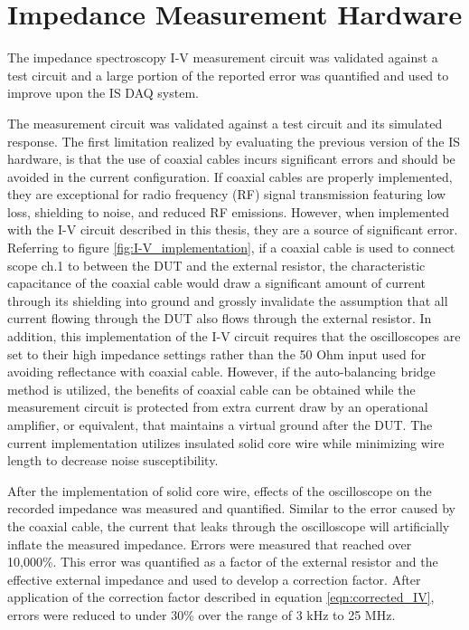 \section{Impedance Measurement Hardware}
\label{sec:discussion on Impedance Measurement Hardware}

\par The impedance spectroscopy I-V measurement circuit was validated against a test circuit and a large portion of the reported error was quantified and used to improve upon the IS DAQ system. 

\par The measurement circuit was validated against a test circuit and its simulated response. The first limitation realized by evaluating the previous version of the IS hardware, is that the use of coaxial cables incurs significant errors and should be avoided in the current configuration. If coaxial cables are properly implemented, they are exceptional for radio frequency (RF) signal transmission featuring low loss, shielding to noise, and reduced RF emissions. However, when implemented with the I-V circuit described in this thesis, they are a source of significant error. Referring to figure \ref{fig:I-V_implementation}, if a coaxial cable is used to connect scope ch.1 to between the DUT and the external resistor, the characteristic capacitance of the coaxial cable would draw a significant amount of current through its shielding into ground and grossly invalidate the assumption that all current flowing through the DUT also flows through the external resistor. In addition, this implementation of the I-V circuit requires that the oscilloscopes are set to their high impedance settings rather than the 50 Ohm input used for avoiding reflectance with coaxial cable. However, if the auto-balancing bridge method is utilized, the benefits of coaxial cable can be obtained while the measurement circuit is protected from extra current draw by an operational amplifier, or equivalent, that maintains a virtual ground after the DUT. The current implementation utilizes insulated solid core wire while minimizing wire length to decrease noise susceptibility. 

\par After the implementation of solid core wire, effects of the oscilloscope on the recorded impedance was measured and quantified. Similar to the error caused by the coaxial cable, the current that leaks through the oscilloscope will artificially inflate the measured impedance. Errors were measured that reached over 10,000\%. This error was quantified as a factor of the external resistor and the effective external impedance and used to develop a correction factor. After application of the correction factor described in equation \ref{eqn:corrected_IV}, errors were reduced to under 30\% over the range of 3 kHz to 25 MHz. 

